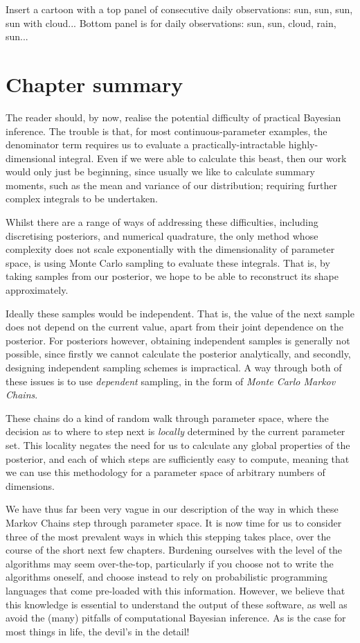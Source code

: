 \documentclass[11pt,fullpage]{book}
\begin{document}
Insert a cartoon with a top panel of consecutive daily observations: sun, sun, sun, sun with cloud... Bottom panel is for daily observations: sun, sun, cloud, rain, sun...

\section{Chapter summary}
The reader should, by now, realise the potential difficulty of practical Bayesian inference. The trouble is that, for most continuous-parameter examples, the denominator term requires us to evaluate a practically-intractable highly-dimensional integral. Even if we were able to calculate this beast, then our work would only just be beginning, since usually we like to calculate summary moments, such as the mean and variance of our distribution; requiring further complex integrals to be undertaken. 

Whilst there are a range of ways of addressing these difficulties, including discretising posteriors, and numerical quadrature, the only method whose complexity does not scale exponentially with the dimensionality of parameter space, is using Monte Carlo sampling to evaluate these integrals. That is, by taking samples from our posterior, we hope to be able to reconstruct its shape approximately.

Ideally these samples would be independent. That is, the value of the next sample does not depend on the current value, apart from their joint dependence on the posterior. For posteriors however, obtaining independent samples is generally not possible, since firstly we cannot calculate the posterior analytically, and secondly, designing independent sampling schemes is impractical. A way through both of these issues is to use \textit{dependent} sampling, in the form of \textit{Monte Carlo Markov Chains}.

These chains do a kind of random walk through parameter space, where the decision as to where to step next is \textit{locally} determined by the current parameter set. This locality negates the need for us to calculate any global properties of the posterior, and each of which steps are sufficiently easy to compute, meaning that we can use this methodology for a parameter space of arbitrary numbers of dimensions. 

We have thus far been very vague in our description of the way in which these Markov Chains step through parameter space. It is now time for us to consider three of the most prevalent ways in which this stepping takes place, over the course of the short next few chapters. Burdening ourselves with the level of the algorithms may seem over-the-top, particularly if you choose not to write the algorithms oneself, and choose instead to rely on probabilistic programming languages that come pre-loaded with this information. However, we believe that this knowledge is essential to understand the output of these software, as well as avoid the (many) pitfalls of computational Bayesian inference. As is the case for most things in life, the devil's in the detail!
\end{document}
